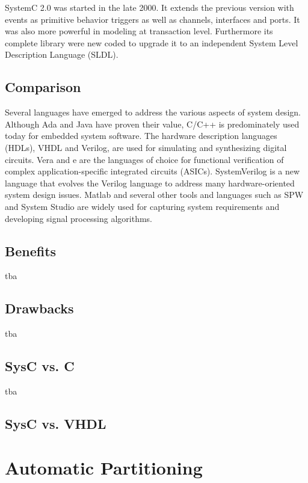 \documentclass{article}
\begin{document}
	    SystemC 2.0 was started in the late 2000. It extends the previous version with events as primitive behavior triggers as well as channels, interfaces and ports.
	    It was also more powerful in modeling at transaction level.
	    Furthermore its complete library were new coded to upgrade it to an independent System Level Description Language (SLDL).
		\subsection{Comparison}
		Several languages have emerged to address the various aspects of system design. Although Ada and Java have proven their value, C/C++ is predominately used today for embedded system software. The hardware description languages (HDLs), VHDL and Verilog, are used for simulating and synthesizing digital circuits. Vera and e are the languages of choice for functional verification of complex application-specific integrated circuits (ASICs). SystemVerilog is a new language that evolves the Verilog language to address many hardware-oriented system design issues. Matlab and several other tools and languages such as SPW and System Studio are widely used for capturing system requirements and developing signal processing algorithms.
	  \subsection{Benefits}
	  tba
	  \subsection{Drawbacks}
	  tba
	  \subsection{SysC vs. C}
	  tba
	  \subsection{SysC vs. VHDL}

	\section{Automatic Partitioning}
\end{document}
